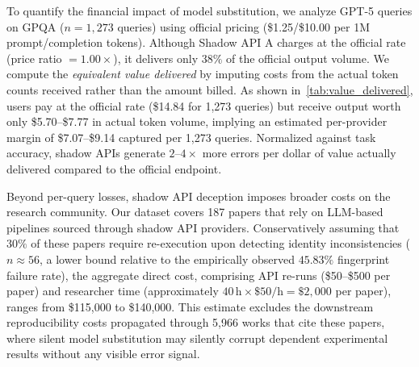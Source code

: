 \documentclass[letterpaper,twocolumn,10pt]{article}
\begin{document}
To quantify the financial impact of model substitution, we analyze GPT-5 queries on GPQA ($n{=}1{,}273$ queries) using official pricing (\$1.25/\$10.00 per 1M prompt/completion tokens).
Although Shadow API A charges at the official rate (price ratio $= 1.00\times$), it delivers only $38\%$ of the official output volume.
We compute the \emph{equivalent value delivered} by imputing costs from the actual token counts received rather than the amount billed.
As shown in~\autoref{tab:value_delivered}, users pay at the official rate (\$14.84 for 1,273 queries) but receive output worth only \$5.70--\$7.77 in actual token volume, implying an estimated per-provider margin of \$7.07--\$9.14 captured per 1,273 queries.
Normalized against task accuracy, shadow APIs generate $2$--$4\times$ more errors per dollar of value actually delivered compared to the official endpoint.

\begin{table}[t!]
\centering
\caption{Equivalent value delivered on GPQA ($n{=}1{,}273$ queries, GPT-5 pricing).
Costs are imputed from measured prompt and completion token counts at official rates (\$1.25/\$10.00 per 1M tokens).}
\label{tab:value_delivered}
\end{table}

Beyond per-query losses, shadow API deception imposes broader costs on the research community.
Our dataset covers 187 papers that rely on LLM-based pipelines sourced through shadow API providers.
Conservatively assuming that $30\%$ of these papers require re-execution upon detecting identity inconsistencies ($n \approx 56$, a lower bound relative to the empirically observed $45.83\%$ fingerprint failure rate), the aggregate direct cost, comprising API re-runs (\$50--\$500 per paper) and researcher time (approximately $40\,\text{h} \times \$50/\text{h} = \$2{,}000$ per paper), ranges from \$115,000 to \$140,000.
This estimate excludes the downstream reproducibility costs propagated through 5,966 works that cite these papers, where silent model substitution may silently corrupt dependent experimental results without any visible error signal.
\end{document}
